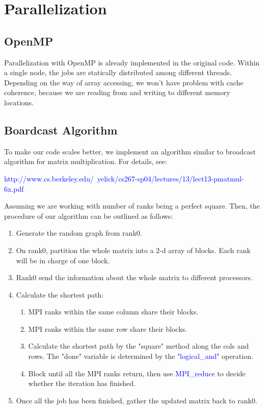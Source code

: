 \section{Parallelization}\label{sec:parallel}
\subsection{OpenMP}

Parallelization with OpenMP is already implemented in the original code. Within a single
node, the jobs are statically distributed among different threads. Depending on the way of
array accessing, we won't have problem with cache coherence, because we are reading from and
writing to different memory locations.

\subsection{Boardcast Algorithm}

To make our code scales better, we implement an algorithm similar to broadcast algorithm for matrix multiplication.
For details, see:
\begin{center}
\textcolor{blue}{http://www.cs.berkeley.edu/~yelick/cs267-sp04/lectures/13/lect13-pmatmul-6x.pdf}
\end{center}
Assuming we are working with number of ranks being a perfect square. Then, the procedure of our algorithm can be
outlined as follows:
\begin{enumerate}
\item Generate the random graph from rank0.
\item On rank0, partition the whole matrix into a 2-d array of blocks. Each rank will be in charge of one block.
\item Rank0 send the information about the whole matrix to different processors.
\item Calculate the shortest path:
	\begin{enumerate}
    \item MPI ranks within the same column share their blocks.
    \item MPI ranks within the same row share their blocks.
    \item Calculate the shortest path by the "square" method along the cols and rows. The "done" variable is
    	  determined by the \textcolor{blue}{"logical\_and"} operation.
    \item Block until all the MPI ranks return, then use \textcolor{blue}{MPI\_reduce} to decide whether the
    	  iteration has finished.
    \end{enumerate}
\item Once all the job has been finished, gather the updated matrix back to rank0.
\end{enumerate}

